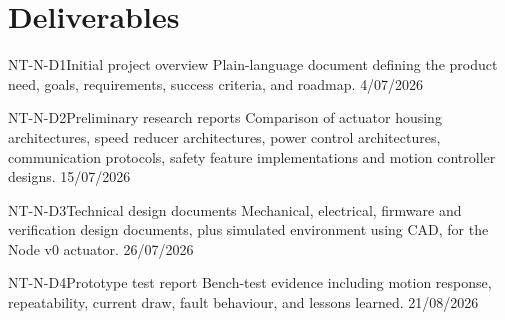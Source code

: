 \documentclass[public]{../../classes/nervtech-overview}
\begin{document}
\section{Deliverables}
\begin{deliverablestable}
\deliverablerow
  {NT-N-D1}{Initial project overview}
  {Plain-language document defining the product need, goals, requirements, success criteria, and roadmap.}
  {4/07/2026}

\deliverablerow
  {NT-N-D2}{Preliminary research reports}
  {Comparison of actuator housing architectures, speed reducer architectures, power control architectures, communication protocols, safety feature implementations and motion controller designs.}
  {15/07/2026}

\deliverablerow
  {NT-N-D3}{Technical design documents}
  {Mechanical, electrical, firmware and verification design documents, plus simulated environment using CAD, for the Node v0 actuator.}
  {26/07/2026}

\deliverablerow
  {NT-N-D4}{Prototype test report}
  {Bench-test evidence including motion response, repeatability, current draw, fault behaviour, and lessons learned.}
  {21/08/2026}
\end{deliverablestable}
\end{document}

